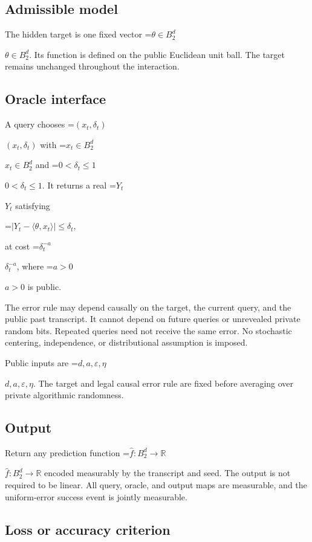 \documentclass[10pt,a4paper]{article}
\newcommand{\AtlasMath}[1]{\par\begingroup\centering\setbox0=\hbox{$\displaystyle #1$}\ifdim\wd0>1.4\linewidth\typeout{ATLAS WIDE FORMULA: \the\wd0}\fi\ifdim\wd0>\linewidth\resizebox{\linewidth}{!}{\box0}\else\box0\fi\par\endgroup}
\newcommand{\AtlasInlineMath}[1]{\begingroup\setbox0=\hbox{$#1$}\ifdim\wd0>.4\linewidth\endgroup\AtlasMath{#1}\else\endgroup$#1$\fi}
\begin{document}
\subsection{Admissible model}


The hidden target is one fixed vector \AtlasInlineMath{\theta\in B_2^d}. Its function is defined on the public Euclidean unit ball. The target remains unchanged throughout the interaction.



\subsection{Oracle interface}


A query chooses \AtlasInlineMath{(x_t,\delta_t)} with \AtlasInlineMath{x_t\in B_2^d} and \AtlasInlineMath{0<\delta_t\le1}. It returns a real \AtlasInlineMath{Y_t} satisfying
\AtlasMath{|Y_t-\langle\theta,x_t\rangle|\le\delta_t,}
 at cost \AtlasInlineMath{\delta_t^{-a}}, where \AtlasInlineMath{a>0} is public.



The error rule may depend causally on the target, the current query, and the public past transcript. It cannot depend on future queries or unrevealed private random bits. Repeated queries need not receive the same error. No stochastic centering, independence, or distributional assumption is imposed.



Public inputs are \AtlasInlineMath{d,a,\varepsilon,\eta}. The target and legal causal error rule are fixed before averaging over private algorithmic randomness.



\subsection{Output}


Return any prediction function \AtlasInlineMath{\widehat f:B_2^d\to\mathbb R} encoded measurably by the transcript and seed. The output is not required to be linear. All query, oracle, and output maps are measurable, and the uniform-error success event is jointly measurable.



\subsection{Loss or accuracy criterion}
\end{document}
